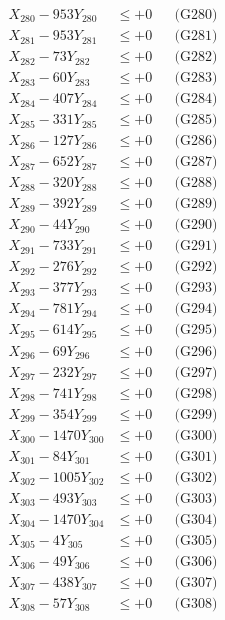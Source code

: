 \documentclass[a4paper,10pt]{article}
\begin{document}
{\begin{align}
X_{280} - 953Y_{280} &\leq +0 && \text{(G280)} \\
\allowbreak
X_{281} - 953Y_{281} &\leq +0 && \text{(G281)} \\
X_{282} - 73Y_{282} &\leq +0 && \text{(G282)} \\
X_{283} - 60Y_{283} &\leq +0 && \text{(G283)} \\
X_{284} - 407Y_{284} &\leq +0 && \text{(G284)} \\
X_{285} - 331Y_{285} &\leq +0 && \text{(G285)} \\
X_{286} - 127Y_{286} &\leq +0 && \text{(G286)} \\
X_{287} - 652Y_{287} &\leq +0 && \text{(G287)} \\
X_{288} - 320Y_{288} &\leq +0 && \text{(G288)} \\
X_{289} - 392Y_{289} &\leq +0 && \text{(G289)} \\
X_{290} - 44Y_{290} &\leq +0 && \text{(G290)} \\
\allowbreak
X_{291} - 733Y_{291} &\leq +0 && \text{(G291)} \\
X_{292} - 276Y_{292} &\leq +0 && \text{(G292)} \\
X_{293} - 377Y_{293} &\leq +0 && \text{(G293)} \\
X_{294} - 781Y_{294} &\leq +0 && \text{(G294)} \\
X_{295} - 614Y_{295} &\leq +0 && \text{(G295)} \\
X_{296} - 69Y_{296} &\leq +0 && \text{(G296)} \\
X_{297} - 232Y_{297} &\leq +0 && \text{(G297)} \\
X_{298} - 741Y_{298} &\leq +0 && \text{(G298)} \\
X_{299} - 354Y_{299} &\leq +0 && \text{(G299)} \\
X_{300} - 1470Y_{300} &\leq +0 && \text{(G300)} \\
\allowbreak
X_{301} - 84Y_{301} &\leq +0 && \text{(G301)} \\
X_{302} - 1005Y_{302} &\leq +0 && \text{(G302)} \\
X_{303} - 493Y_{303} &\leq +0 && \text{(G303)} \\
X_{304} - 1470Y_{304} &\leq +0 && \text{(G304)} \\
X_{305} - 4Y_{305} &\leq +0 && \text{(G305)} \\
X_{306} - 49Y_{306} &\leq +0 && \text{(G306)} \\
X_{307} - 438Y_{307} &\leq +0 && \text{(G307)} \\
X_{308} - 57Y_{308} &\leq +0 && \text{(G308)} \\

\end{align}}
\end{document}
